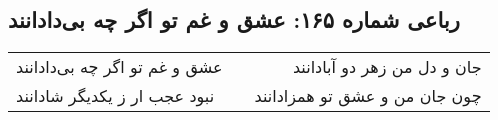 \begin{center}
\section*{رباعی شماره ۱۶۵: عشق و غم تو اگر چه بی‌دادانند}
\label{sec:sh165}
\begin{longtable}{l p{0.5cm} r}
عشق و غم تو اگر چه بی‌دادانند
&&
جان و دل من زهر دو آبادانند
\\
نبود عجب ار ز یکدیگر شادانند
&&
چون جان من و عشق تو همزادانند
\\
\end{longtable}
\end{center}
